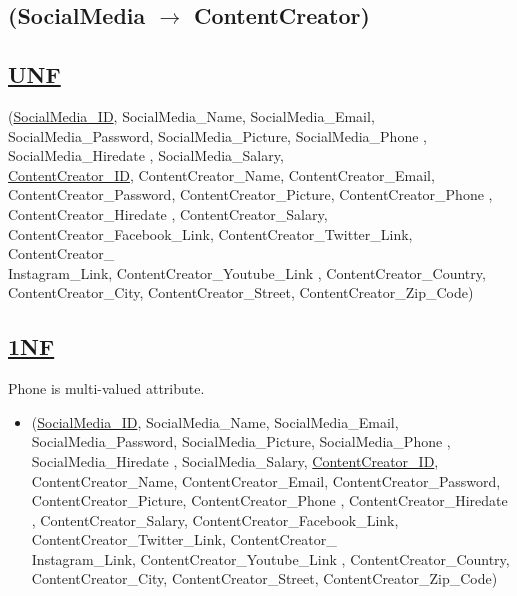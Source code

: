 \subsection{\texorpdfstring{\centering (SocialMedia $\rightarrow$ ContentCreator)}{ (ContentCreator-SocialMedia)}}

\subsection*{\underline{UNF}}

(\underline{SocialMedia\_ID}, SocialMedia\_Name, SocialMedia\_Email, SocialMedia\_Password, SocialMedia\_Picture, SocialMedia\_Phone , SocialMedia\_Hiredate , SocialMedia\_Salary,\\
\underline{ContentCreator\_ID}, ContentCreator\_Name, ContentCreator\_Email, ContentCreator\_Password, ContentCreator\_Picture, ContentCreator\_Phone , ContentCreator\_Hiredate , ContentCreator\_Salary,
ContentCreator\_Facebook\_Link, ContentCreator\_Twitter\_Link, ContentCreator\_\\Instagram\_Link, ContentCreator\_Youtube\_Link ,
ContentCreator\_Country, ContentCreator\_City, ContentCreator\_Street, ContentCreator\_Zip\_Code)

\subsection*{\underline{1NF}}
Phone is multi-valued attribute.
\vskip 0.2in

\begin{itemize}
    \item
          (\underline{SocialMedia\_ID}, SocialMedia\_Name, SocialMedia\_Email, SocialMedia\_Password, SocialMedia\_Picture, SocialMedia\_Phone , SocialMedia\_Hiredate , SocialMedia\_Salary,
          \underline{ContentCreator\_ID}, ContentCreator\_Name, ContentCreator\_Email, ContentCreator\_Password, ContentCreator\_Picture, ContentCreator\_Phone , ContentCreator\_Hiredate , ContentCreator\_Salary,
          ContentCreator\_Facebook\_Link, ContentCreator\_Twitter\_Link, ContentCreator\_\\Instagram\_Link, ContentCreator\_Youtube\_Link ,
          ContentCreator\_Country, ContentCreator\_City, ContentCreator\_Street, ContentCreator\_Zip\_Code)
\end{itemize}


